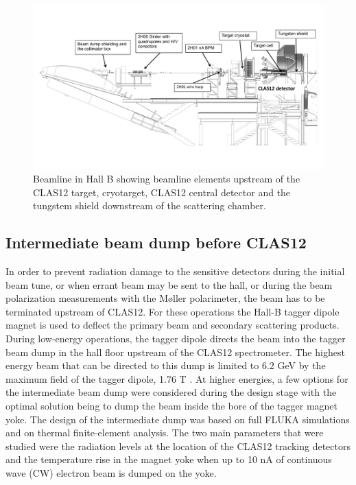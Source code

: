 \begin{figure}[t]
\begin{center}
\includegraphics[width=1.\textwidth]{beamline_hall_1.pdf}
	\caption{Beamline in Hall B showing beamline elements upstream of the CLAS12 target, cryotarget, CLAS12 central detector and 
	the tungstem shield downstream of the scattering chamber.}
\label{fig:hall1}
\end{center}
\end{figure}


\subsection{Intermediate beam dump before CLAS12}
\label{sec-IBD}

In order to prevent radiation damage to the sensitive detectors during the initial beam tune, or when errant beam may be sent to the hall, 
or during the beam polarization measurements with the M{\o}ller polarimeter, the beam has to be terminated upstream of CLAS12. For these 
operations the Hall-B tagger dipole magnet is used to deflect the primary beam and secondary scattering products. During low-energy 
operations, the tagger dipole directs the beam into the tagger beam dump in the hall floor upstream of the CLAS12 spectrometer. The highest 
energy beam that can be directed to this dump is limited to $6.2$ GeV by the maximum field of the tagger dipole, 
1.76 T \cite{tagger}. At higher energies, a few options for the intermediate beam dump were considered during the design stage with 
the optimal solution being to dump the beam inside the bore of the tagger magnet yoke. The design of the intermediate dump was based on
full FLUKA \cite{fluka} simulations and on thermal finite-element analysis. The two main parameters that were studied were the radiation levels at 
the location of the CLAS12 tracking detectors and the temperature rise in the magnet yoke when up to 10 nA of continuous wave (CW) 
electron beam is dumped on the yoke.  

